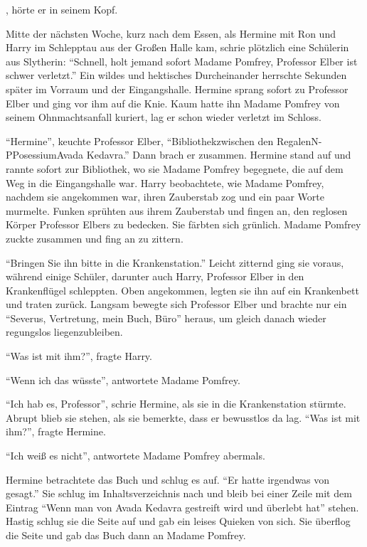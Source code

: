 , hörte er in seinem Kopf.



Mitte der nächsten Woche, kurz nach dem Essen, als Hermine mit Ron und Harry im Schlepptau aus der Großen Halle kam, schrie plötzlich eine Schülerin aus Slytherin: \enquote{Schnell, holt jemand sofort Madame Pomfrey, Professor Elber ist schwer verletzt.} Ein wildes und hektisches Durcheinander herrschte Sekunden später im Vorraum und der Eingangshalle. Hermine sprang sofort zu Professor Elber und ging vor ihm auf die Knie. Kaum hatte ihn Madame Pomfrey von seinem Ohnmachtsanfall kuriert, lag er schon wieder verletzt im Schloss.

\enquote{Hermine}, keuchte Professor Elber, \enquote{Bibliothek\abs zwischen den Regalen\abs N-P\abs Posessium\gst Avada Kedavra.} Dann brach er zusammen. Hermine stand auf und rannte sofort zur Bibliothek, wo sie Madame Pomfrey begegnete, die auf dem Weg in die Eingangshalle war. Harry beobachtete, wie Madame Pomfrey, nachdem sie angekommen war, ihren Zauberstab zog und ein paar Worte murmelte. Funken sprühten aus ihrem Zauberstab und fingen an, den reglosen Körper Professor Elbers zu bedecken. Sie färbten sich grünlich. Madame Pomfrey zuckte zusammen und fing an zu zittern.

\enquote{Bringen Sie ihn bitte in die Krankenstation.} Leicht zitternd ging sie voraus, während einige Schüler, darunter auch Harry, Professor Elber in den Krankenflügel schleppten. Oben angekommen, legten sie ihn auf ein Krankenbett und traten zurück. Langsam bewegte sich Professor Elber und brachte nur ein \enquote{Severus, Vertretung, mein Buch, Büro} heraus, um gleich danach wieder regungslos liegenzubleiben.

\enquote{Was ist mit ihm?}, fragte Harry.

\enquote{Wenn ich das wüsste}, antwortete Madame Pomfrey.

\enquote{Ich hab es, Professor}, schrie Hermine, als sie in die Krankenstation stürmte. Abrupt blieb sie stehen, als sie bemerkte, dass er bewusstlos da lag. \enquote{Was ist mit ihm?}, fragte Hermine.

\enquote{Ich weiß es nicht}, antwortete Madame Pomfrey abermals.

Hermine betrachtete das Buch und schlug es auf. \enquote{Er hatte irgendwas von  gesagt.} Sie schlug im Inhaltsverzeichnis nach und bleib bei einer Zeile mit dem Eintrag \enquote{Wenn man von Avada Kedavra gestreift wird und überlebt hat\abs} stehen. Hastig schlug sie die Seite auf und gab ein leises Quieken von sich.
Sie überflog die Seite und gab das Buch dann an Madame Pomfrey.

